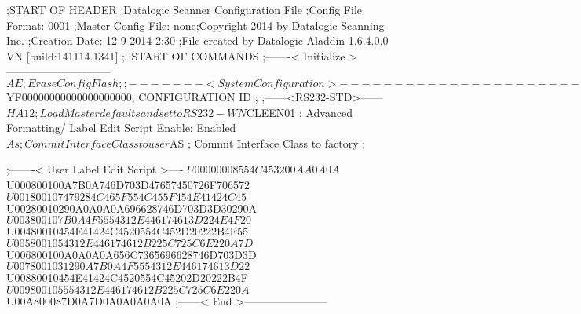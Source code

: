 ;START OF HEADER
;Datalogic Scanner Configuration File
;Config File Format: 0001
;Master Config File: none;Copyright 2014 by Datalogic Scanning Inc.
;Creation Date: 12 9 2014 2:30
;File created by Datalogic Aladdin 1.6.4.0.0 VN [build:141114.1341]
;
;START OF COMMANDS
;-------< Initialize >-----------------------------
$AE                 ; Erase Config Flash
;
;-------< System Configuration >-------------------------------
$YF00000000000000000000; CONFIGURATION ID
;
;------<RS232-STD>------
$HA12               ; Load Master defaults and set to RS232-WN
$CLEEN01            ; Advanced Formatting/ Label Edit Script Enable: Enabled
$As                 ; Commit Interface Class to user
$AS                 ; Commit Interface Class to factory
;

;-------< User Label Edit Script >----
$U00000008554C453200AA0A0A
$U000800100A7B0A746D703D47657450726F706572
$U001800107479284C465F554C455F454E41424C45
$U00280010290A0A0A0A696628746D703D3D30290A
$U003800107B0A4F5554312E446174613D224E4F20
$U00480010454E41424C4520554C452D20222B4F55
$U0058001054312E446174612B225C725C6E220A7D
$U006800100A0A0A0A656C7365696628746D703D3D
$U0078001031290A7B0A4F5554312E446174613D22
$U00880010454E41424C4520554C45202D20222B4F
$U009800105554312E446174612B225C725C6E220A
$U00A800087D0A7D0A0A0A0A0A
;------< End >-----------------------
